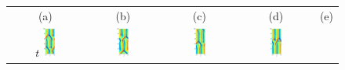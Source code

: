 \begin{figure}[t]
\begin{center}
\begin{tabular}{ccccc} (a) & (b) & (c) & (d) & (e)\\
$t$
\includegraphics[width=0.18\textwidth]{figs/ks22rpo047.6-05.68.eps}\hspace{-3ex} &
\includegraphics[width=0.18\textwidth]{figs/ks22rpo055.6-05.25.eps}\hspace{-3ex} &
\includegraphics[width=0.18\textwidth]{figs/ks22rpo059.9-05.44.eps}\hspace{-3ex} &
\includegraphics[width=0.18\textwidth]{figs/ks22rpo071.7-05.50.eps}\hspace{-3ex} &

\end{tabular}
\end{center}
\end{figure}
